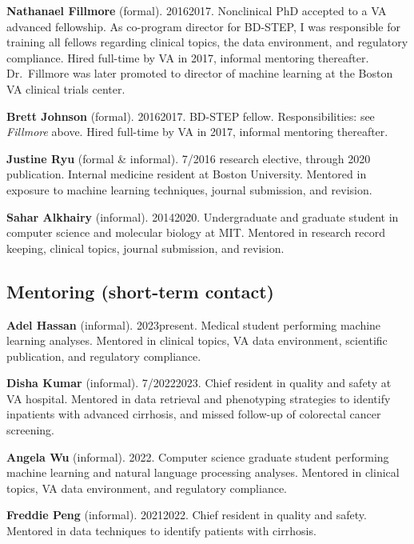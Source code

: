 \documentclass[10pt]{article}
\begin{document}
\textbf{Nathanael Fillmore} (formal). 2016\ndash{}2017.
Nonclinical PhD accepted to a VA advanced fellowship. As co-program
director for BD-STEP, I was responsible for training all fellows
regarding clinical topics, the data environment, and regulatory
compliance. Hired full-time by VA in 2017, informal mentoring
thereafter. Dr.\ Fillmore was later promoted to director of machine
learning at the Boston VA clinical trials center.

\textbf{Brett Johnson} (formal). 2016\ndash{}2017. BD-STEP
fellow. Responsibilities: see \emph{Fillmore} above. Hired full-time
by VA in 2017, informal mentoring thereafter.

\textbf{Justine Ryu} (formal \& informal). 7/2016 research elective,
through 2020 publication. Internal medicine resident at Boston
University. Mentored in exposure to machine learning techniques,
journal submission, and revision.

\textbf{Sahar Alkhairy} (informal). 2014\ndash{}2020. Undergraduate
and graduate student in computer science and molecular biology at MIT.
Mentored in research record keeping, clinical topics, journal
submission, and revision.




\subsection*{Mentoring (short-term contact)}


\textbf{Adel Hassan} (informal). 2023\ndash{}present. Medical student
performing machine learning analyses. Mentored in clinical topics, VA
data environment, scientific publication, and regulatory compliance.

\textbf{Disha Kumar} (informal). 7/2022\ndash{}2023. Chief resident
in quality and safety at VA hospital. Mentored in data retrieval and
phenotyping strategies to identify inpatients with advanced cirrhosis,
and missed follow-up of colorectal cancer screening.

\textbf{Angela Wu} (informal). 2022. Computer science graduate student
performing machine learning and natural language processing analyses.
Mentored in clinical topics, VA data environment, and regulatory
compliance.

\textbf{Freddie Peng} (informal). 2021\ndash{}2022. Chief resident in
quality and safety. Mentored in data techniques to identify patients
with cirrhosis.
\end{document}
